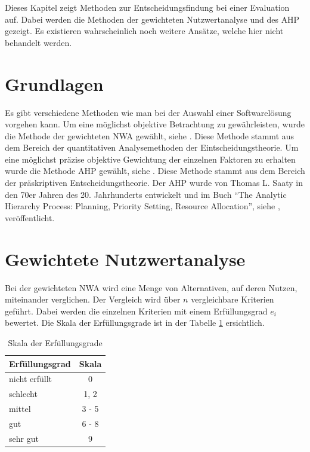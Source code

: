   Dieses Kapitel zeigt Methoden zur Entscheidungsfindung bei einer Evaluation
  auf. Dabei werden die Methoden der gewichteten Nutzwertanalyse und des
  \ac{AHP} gezeigt. Es existieren wahrscheinlich noch weitere Ansätze, welche
  hier nicht behandelt werden.
  
  \section{Grundlagen}
  
  Es gibt verschiedene Methoden wie man bei der Auswahl einer Softwarelösung
  vorgehen kann. Um eine möglichst objektive Betrachtung zu gewährleisten, wurde
  die Methode der gewichteten \ac{NWA} gewählt, siehe \cite{Nutzwertanalyse}.
  Diese Methode stammt aus dem Bereich der quantitativen Analysemethoden der
  Eintscheidungstheorie. Um eine möglichst präzise objektive Gewichtung der
  einzelnen Faktoren zu erhalten wurde die Methode \ac{AHP} gewählt, siehe
  \cite{AnalyticHierarchyProcess}. Diese Methode stammt aus dem Bereich der
  präskriptiven Entscheidungstheorie. Der \ac{AHP} wurde von Thomas L. Saaty in
  den 70er Jahren des 20. Jahrhunderts entwickelt und im Buch ``The Analytic
  Hierarchy Process: Planning, Priority Setting, Resource
  Allocation'', siehe \cite{AnalyticHierarchyProcessBook}, veröffentlicht.
  
  \section{Gewichtete Nutzwertanalyse}
  
  Bei der gewichteten \ac{NWA} wird eine Menge von Alternativen, auf deren
  Nutzen, miteinander verglichen. Der Vergleich wird über \(n\) vergleichbare
  Kriterien geführt. Dabei werden die einzelnen Kriterien mit einem
  Erfüllungsgrad \(e_i\) bewertet. Die Skala der Erfüllungsgrade ist in der
  Tabelle \ref{tab:erfuellungsgrade} ersichtlich.
  \newline
  
  \begin{table}[ht]
    \sffamily 
    \begin{center}
      \begin{tabular}{lc}
        \toprule
        Erfüllungsgrad & Skala\\
        \midrule
        nicht erfüllt & 0\\
        schlecht & 1, 2\\
        mittel & 3 - 5\\
        gut & 6 - 8\\
        sehr gut & 9\\
        \bottomrule
      \end{tabular}
      \caption{Skala der Erfüllungsgrade}
      \label{tab:erfuellungsgrade}
    \end{center}
  \end{table}
  
